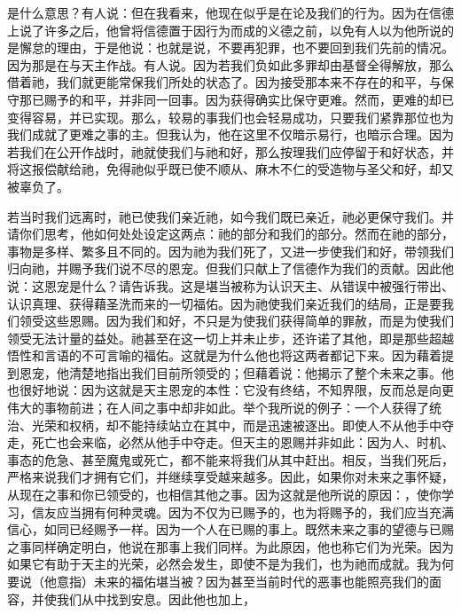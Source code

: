  \par

是什么意思？有人说：但在我看来，他现在似乎是在论及我们的行为。因为在信德上说了许多之后，他曾将信德置于因行为而成的义德之前，以免有人以为他所说的是懈怠的理由，于是他说：也就是说，不要再犯罪，也不要回到我们先前的情况。因为那是在与天主作战。有人说。因为若我们负如此多罪却由基督全得解放，那么借着祂，我们就更能常保我们所处的状态了。因为接受那本来不存在的和平，与保守那已赐予的和平，并非同一回事。因为获得确实比保守更难。然而，更难的却已变得容易，并已实现。那么，较易的事我们也会轻易成功，只要我们紧靠那位也为我们成就了更难之事的主。但我认为，他在这里不仅暗示易行，也暗示合理。因为若我们在公开作战时，祂就使我们与祂和好，那么按理我们应停留于和好状态，并将这报偿献给祂，免得祂似乎既已使不顺从、麻木不仁的受造物与圣父和好，却又被辜负了。\par

 \par

若当时我们远离时，祂已使我们亲近祂，如今我们既已亲近，祂必更保守我们。并请你们思考，他如何处处设定这两点：祂的部分和我们的部分。然而在祂的部分，事物是多样、繁多且不同的。因为祂为我们死了，又进一步使我们和好，带领我们归向祂，并赐予我们说不尽的恩宠。但我们只献上了信德作为我们的贡献。因此他说：这恩宠是什么？请告诉我。这是堪当被称为认识天主、从错误中被强行带出、认识真理、获得藉圣洗而来的一切福佑。因为祂使我们亲近我们的结局，正是要我们领受这些恩赐。因为我们和好，不只是为使我们获得简单的罪赦，而是为使我们领受无法计量的益处。祂甚至在这一切上并未止步，还许诺了其他，即是那些超越悟性和言语的不可言喻的福佑。这就是为什么他也将这两者都记下来。因为藉着提到恩宠，他清楚地指出我们目前所领受的；但藉着说：他揭示了整个未来之事。他也很好地说：因为这就是天主恩宠的本性：它没有终结，不知界限，反而总是向更伟大的事物前进；在人间之事中却非如此。举个我所说的例子：一个人获得了统治、光荣和权柄，却不能持续站立在其中，而是迅速被逐出。即使人不从他手中夺走，死亡也会来临，必然从他手中夺走。但天主的恩赐并非如此：因为人、时机、事态的危急、甚至魔鬼或死亡，都不能来将我们从其中赶出。相反，当我们死后，严格来说我们才拥有它们，并继续享受越来越多。因此，如果你对未来之事怀疑，从现在之事和你已领受的，也相信其他之事。因为这就是他所说的原因：，使你学习，信友应当拥有何种灵魂。因为不仅为已赐予的，也为将赐予的，我们应当充满信心，如同已经赐予一样。因为一个人在已赐的事上。既然未来之事的望德与已赐之事同样确定明白，他说在那事上我们同样。为此原因，他也称它们为光荣。因为如果它有助于天主的光荣，必然会发生，即使不是为我们，也为祂而成就。我为何要说（他意指）未来的福佑堪当被？因为甚至当前时代的恶事也能照亮我们的面容，并使我们从中找到安息。因此他也加上，\par

